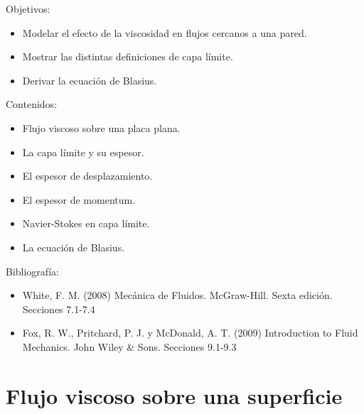 \begin{framed}

Objetivos:
\begin{itemize}
    \item Modelar el efecto de la viscosidad en flujos cercanos a una pared.
    \item Mostrar las distintas definiciones de capa límite.
    \item Derivar la ecuación de Blasius.
\end{itemize}

Contenidos:
\begin{itemize}
    \item Flujo viscoso sobre una placa plana.
    \item La capa límite y su espesor.
    \item El espesor de desplazamiento.
    \item El espesor de momentum.
    \item Navier-Stokes en capa límite.
    \item La ecuación de Blasius.
\end{itemize}

Bibliografía:
\begin{itemize}
    \item White, F. M. (2008) Mecánica de Fluidos. McGraw-Hill. Sexta edición. Secciones 7.1-7.4
    \item Fox, R. W., Pritchard, P. J. y McDonald, A. T. (2009) Introduction to Fluid Mechanics. John Wiley \& Sons. Secciones 9.1-9.3
\end{itemize}
\end{framed}

\section*{Flujo viscoso sobre una superficie}

